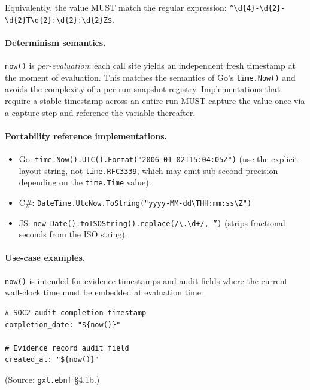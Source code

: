 Equivalently, the value MUST match the regular expression:
\texttt{\textasciicircum\textbackslash d\{4\}-\textbackslash d\{2\}-\textbackslash d\{2\}T\textbackslash d\{2\}:\textbackslash d\{2\}:\textbackslash d\{2\}Z\$}.

\paragraph{Determinism semantics.}
\texttt{now()} is \emph{per-evaluation}: each call site yields an
independent fresh timestamp at the moment of evaluation.  This matches
the semantics of Go's \texttt{time.Now()} and avoids the complexity of a
per-run snapshot registry.  Implementations that require a stable timestamp
across an entire run MUST capture the value once via a capture step and
reference the variable thereafter.

\paragraph{Portability reference implementations.}

\begin{itemize}
  \item Go: \texttt{time.Now().UTC().Format("2006-01-02T15:04:05Z")}
    (use the explicit layout string, not \texttt{time.RFC3339}, which
    may emit sub-second precision depending on the \texttt{time.Time}
    value).
  \item C\#: \texttt{DateTime.UtcNow.ToString("yyyy-MM-dd\textbackslash{}THH:mm:ss\textbackslash{}Z")}
  \item JS: \texttt{new Date().toISOString().replace(/\textbackslash.\textbackslash d+/, '')}
    (strips fractional seconds from the ISO string).
\end{itemize}

\paragraph{Use-case examples.}
\texttt{now()} is intended for evidence timestamps and audit fields where
the current wall-clock time must be embedded at evaluation time:

\begin{verbatim}
# SOC2 audit completion timestamp
completion_date: "${now()}"

# Evidence record audit field
created_at: "${now()}"
\end{verbatim}

(Source: \texttt{gxl.ebnf} \S4.1b.)

